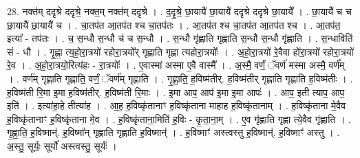 \documentclass[17pt]{extarticle}
\begin{document}
28. नक्त॑म् ददृश्रे ददृश्रे॒ नक्त॒म् नक्त॑म् ददृश्रे । . द॒दृ॒श्रे॒ छा॒यायै॑ छा॒यायै॑ ददृश्रे ददृश्रे छा॒यायै᳚ । . छा॒यायै॑ च च छा॒यायै॑ छा॒यायै॑ च । . चा॒तप॑त आ॒तप॑त श्च चा॒तप॑तः । . आ॒तप॑त श्च चा॒तप॑त आ॒तप॑त श्च । . आ॒तप॑त॒ इत्या᳚ - तप॑तः । . च॒ स॒न्धौ स॒न्धौ च॑ च स॒न्धौ । . स॒न्धौ गृ॑ह्णाति गृह्णाति स॒न्धौ स॒न्धौ गृ॑ह्णाति । . स॒न्धाविति॑ सं - धौ । . गृ॒ह्णा॒ त्य॒हो॒रा॒त्रयो॑ रहोरा॒त्रयो᳚र् गृह्णाति गृह्णा त्यहोरा॒त्रयोः᳚ । . अ॒हो॒रा॒त्रयो॑ रे॒वैवा हो॑रा॒त्रयो॑ रहोरा॒त्रयो॑ रे॒व । . अ॒हो॒रा॒त्रयो॒रित्य॑हः - रा॒त्रयोः᳚ । . ए॒वास्मा॑ अस्मा ए॒वै वास्मै᳚ । . अ॒स्मै॒ वर्णं॒ ॅवर्ण॑ मस्मा अस्मै॒ वर्ण᳚म् । . वर्ण॑म् गृह्णाति गृह्णाति॒ वर्णं॒ ॅवर्ण॑म् गृह्णाति । . गृ॒ह्णा॒ति॒ ह॒विष्म॑तीर्. ह॒विष्म॑तीर् गृह्णाति गृह्णाति ह॒विष्म॑तीः । . ह॒विष्म॑ती रि॒मा इ॒मा ह॒विष्म॑तीर्. ह॒विष्म॑ती रि॒माः । . इ॒मा आप॒ आप॑ इ॒मा इ॒मा आपः॑ । . आप॒ इती त्याप॒ आप॒ इति॑ । . इत्या॑हा॒हे तीत्या॑ह । . आ॒ह॒ ह॒विष्कृ॑तानाꣳ ह॒विष्कृ॑ताना माहाह ह॒विष्कृ॑तानाम् । . ह॒विष्कृ॑ताना मे॒वैव ह॒विष्कृ॑तानाꣳ ह॒विष्कृ॑ताना मे॒व । . ह॒विष्कृ॑ताना॒मिति॑ ह॒विः - कृ॒ता॒ना॒म् । . ए॒व गृ॑ह्णाति गृह्णा त्ये॒वैव गृ॑ह्णाति । . गृ॒ह्णा॒ति॒ ह॒विष्मान्॑. ह॒विष्मा᳚न् गृह्णाति गृह्णाति ह॒विष्मान्॑ । . ह॒विष्माꣳ॑ अस्त्वस्तु ह॒विष्मान्॑. ह॒विष्माꣳ॑ अस्तु । . अ॒स्तु॒ सूर्यः॒ सूर्यो॑ अस्त्वस्तु॒ सूर्यः॑ । \newline
\end{document}
